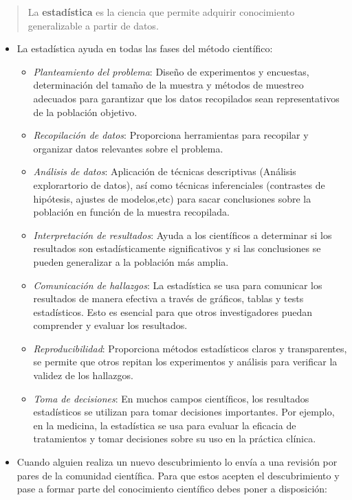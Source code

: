 \documentclass[
  letterpaper,
  DIV=11,
  numbers=noendperiod]{scrreprt}
\begin{document}
\begin{quote}
La \textbf{estadística} es la ciencia que permite adquirir conocimiento
generalizable a partir de datos.
\end{quote}

\begin{itemize}
\item
  La estadística ayuda en todas las fases del método científico:

  \begin{itemize}
  \item
    {\emph{Planteamiento del problema}}: Diseño de experimentos y
    encuestas, determinación del tamaño de la muestra y métodos de
    muestreo adecuados para garantizar que los datos recopilados sean
    representativos de la población objetivo.
  \item
    {\emph{Recopilación de datos}}: Proporciona herramientas para
    recopilar y organizar datos relevantes sobre el problema.
  \item
    {\emph{Análisis de datos}}: Aplicación de técnicas descriptivas
    (Análisis explorartorio de datos), así como técnicas inferenciales
    (contrastes de hipótesis, ajustes de modelos,etc) para sacar
    conclusiones sobre la población en función de la muestra recopilada.
  \item
    {\emph{Interpretación de resultados}}: Ayuda a los científicos a
    determinar si los resultados son estadísticamente significativos y
    si las conclusiones se pueden generalizar a la población más amplia.
  \item
    {\emph{Comunicación de hallazgos}}: La estadística se usa para
    comunicar los resultados de manera efectiva a través de gráficos,
    tablas y tests estadísticos. Esto es esencial para que otros
    investigadores puedan comprender y evaluar los resultados.
  \item
    {\emph{Reproducibilidad}}: Proporciona métodos estadísticos claros y
    transparentes, se permite que otros repitan los experimentos y
    análisis para verificar la validez de los hallazgos.
  \item
    {\emph{Toma de decisiones}}: En muchos campos científicos, los
    resultados estadísticos se utilizan para tomar decisiones
    importantes. Por ejemplo, en la medicina, la estadística se usa para
    evaluar la eficacia de tratamientos y tomar decisiones sobre su uso
    en la práctica clínica.
  \end{itemize}
\item
  Cuando alguien realiza un nuevo descubrimiento lo envía a una revisión
  por pares de la comunidad científica. Para que estos acepten el
  descubrimiento y pase a formar parte del conocimiento científico debes
  poner a disposición:


\end{itemize}
\end{document}
